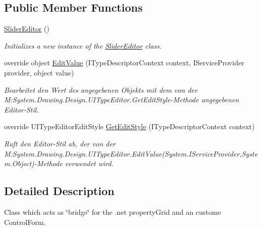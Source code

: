 \subsection*{Public Member Functions}
\begin{DoxyCompactItemize}
\item 
\hyperlink{class_a_rdev_kit_1_1_view_1_1_slider_editor_a957913dea0c46ce3b6fab0d23f51ba2d}{Slider\-Editor} ()
\begin{DoxyCompactList}\small\item\em Initializes a new instance of the \hyperlink{class_a_rdev_kit_1_1_view_1_1_slider_editor}{Slider\-Editor} class. \end{DoxyCompactList}\item 
override object \hyperlink{class_a_rdev_kit_1_1_view_1_1_slider_editor_acce1dcd63136f491590e0917d1f73532}{Edit\-Value} (I\-Type\-Descriptor\-Context context, I\-Service\-Provider provider, object value)
\begin{DoxyCompactList}\small\item\em Bearbeitet den Wert des angegebenen Objekts mit dem von der M\-:\-System.\-Drawing.\-Design.\-U\-I\-Type\-Editor.\-Get\-Edit\-Style-\/\-Methode angegebenen Editor-\/\-Stil. \end{DoxyCompactList}\item 
override U\-I\-Type\-Editor\-Edit\-Style \hyperlink{class_a_rdev_kit_1_1_view_1_1_slider_editor_a8c914aecf1ea867a92871fe81572f13e}{Get\-Edit\-Style} (I\-Type\-Descriptor\-Context context)
\begin{DoxyCompactList}\small\item\em Ruft den Editor-\/\-Stil ab, der von der M\-:\-System.\-Drawing.\-Design.\-U\-I\-Type\-Editor.\-Edit\-Value(\-System.\-I\-Service\-Provider,\-System.\-Object)-\/\-Methode verwendet wird. \end{DoxyCompactList}\end{DoxyCompactItemize}


\subsection{Detailed Description}
Class which acts as \char`\"{}bridge\char`\"{} for the .net property\-Grid and an custome Control\-Form. 



